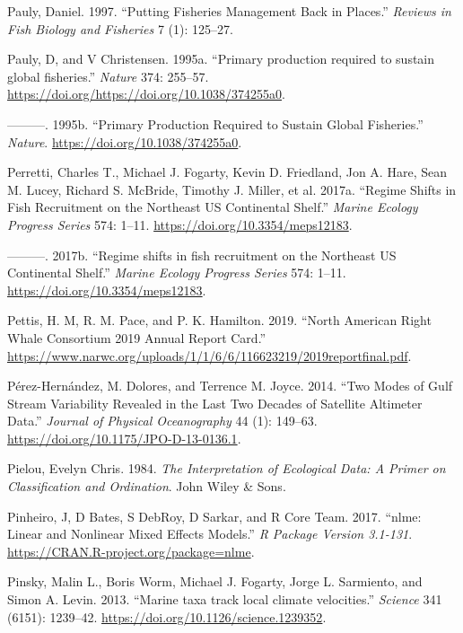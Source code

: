\documentclass[
]{book}
\newlength{\cslhangindent}
\newenvironment{cslreferences}%
  {\setlength{\parindent}{0pt}%
  \everypar{\setlength{\hangindent}{\cslhangindent}}\ignorespaces}%
  {\par}
\begin{document}
\begin{cslreferences}
\leavevmode\hypertarget{ref-pauly_putting_1997}{}%
Pauly, Daniel. 1997. ``Putting Fisheries Management Back in Places.'' \emph{Reviews in Fish Biology and Fisheries} 7 (1): 125--27.

\leavevmode\hypertarget{ref-pauly1995ppr}{}%
Pauly, D, and V Christensen. 1995a. ``Primary production required to sustain global fisheries.'' \emph{Nature} 374: 255--57. \url{https://doi.org/https://doi.org/10.1038/374255a0}.

\leavevmode\hypertarget{ref-pauly1995}{}%
---------. 1995b. ``Primary Production Required to Sustain Global Fisheries.'' \emph{Nature}. \url{https://doi.org/10.1038/374255a0}.

\leavevmode\hypertarget{ref-perretti_regime_2017}{}%
Perretti, Charles T., Michael J. Fogarty, Kevin D. Friedland, Jon A. Hare, Sean M. Lucey, Richard S. McBride, Timothy J. Miller, et al. 2017a. ``Regime Shifts in Fish Recruitment on the Northeast US Continental Shelf.'' \emph{Marine Ecology Progress Series} 574: 1--11. \url{https://doi.org/10.3354/meps12183}.

\leavevmode\hypertarget{ref-Perretti2017}{}%
---------. 2017b. ``Regime shifts in fish recruitment on the Northeast US Continental Shelf.'' \emph{Marine Ecology Progress Series} 574: 1--11. \url{https://doi.org/10.3354/meps12183}.

\leavevmode\hypertarget{ref-narw2019}{}%
Pettis, H. M, R. M. Pace, and P. K. Hamilton. 2019. ``North American Right Whale Consortium 2019 Annual Report Card.'' \url{https://www.narwc.org/uploads/1/1/6/6/116623219/2019reportfinal.pdf}.

\leavevmode\hypertarget{ref-perez-hernandez2014}{}%
Pérez-Hernández, M. Dolores, and Terrence M. Joyce. 2014. ``Two Modes of Gulf Stream Variability Revealed in the Last Two Decades of Satellite Altimeter Data.'' \emph{Journal of Physical Oceanography} 44 (1): 149--63. \url{https://doi.org/10.1175/JPO-D-13-0136.1}.

\leavevmode\hypertarget{ref-Pielou1984}{}%
Pielou, Evelyn Chris. 1984. \emph{The Interpretation of Ecological Data: A Primer on Classification and Ordination}. John Wiley \& Sons.

\leavevmode\hypertarget{ref-Pinheiro2017}{}%
Pinheiro, J, D Bates, S DebRoy, D Sarkar, and R Core Team. 2017. ``nlme: Linear and Nonlinear Mixed Effects Models.'' \emph{R Package Version 3.1-131}. \url{https://CRAN.R-project.org/package=nlme}.

\leavevmode\hypertarget{ref-Pinsky2013}{}%
Pinsky, Malin L., Boris Worm, Michael J. Fogarty, Jorge L. Sarmiento, and Simon A. Levin. 2013. ``Marine taxa track local climate velocities.'' \emph{Science} 341 (6151): 1239--42. \url{https://doi.org/10.1126/science.1239352}.


\end{cslreferences}
\end{document}
